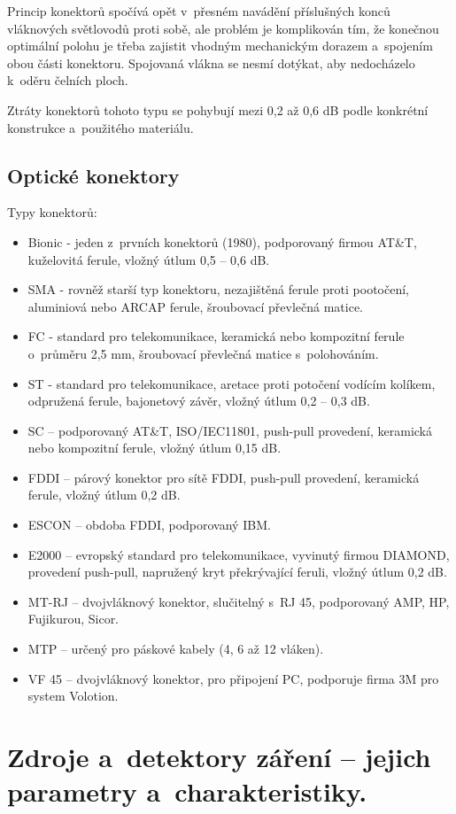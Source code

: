 Princip konektorů spočívá opět v~přesném navádění příslušných konců vláknových světlovodů proti sobě, ale problém je komplikován tím, že konečnou optimální polohu je třeba zajistit vhodným mechanickým dorazem a~spojením obou části konektoru. Spojovaná vlákna se nesmí dotýkat, aby nedocházelo k~oděru čelních ploch.

Ztráty konektorů tohoto typu se pohybují mezi 0,2 až 0,6 dB podle konkrétní konstrukce a~použitého materiálu.

\subsection{Optické konektory}
Typy konektorů:
\begin{itemize}
  \item Bionic - jeden z~prvních konektorů (1980), podporovaný firmou AT\&T, kuželovitá ferule, vložný útlum 0,5 – 0,6 dB.
  \item SMA - rovněž starší typ konektoru, nezajištěná ferule proti pootočení, aluminiová nebo ARCAP ferule, šroubovací převlečná matice.
  \item FC - standard pro telekomunikace, keramická nebo kompozitní ferule o~průměru 2,5 mm, šroubovací převlečná matice s~polohováním.
  \item ST - standard pro telekomunikace, aretace proti potočení vodícím kolíkem, odpružená ferule, bajonetový závěr, vložný útlum 0,2 – 0,3 dB.
  \item SC – podporovaný AT\&T, ISO/IEC11801, push-pull provedení, keramická nebo kompozitní ferule, vložný útlum 0,15 dB.
  \item FDDI – párový konektor pro sítě FDDI, push-pull provedení, keramická ferule, vložný útlum 0,2 dB.
  \item ESCON – obdoba FDDI, podporovaný IBM.
  \item E2000 – evropský standard pro telekomunikace, vyvinutý firmou DIAMOND, provedení push-pull, napružený kryt překrývající feruli, vložný útlum 0,2 dB.
  \item MT-RJ – dvojvláknový konektor, slučitelný s~RJ 45, podporovaný AMP, HP, Fujikurou, Sicor.
  \item MTP – určený pro páskové kabely (4, 6 až 12 vláken).
  \item VF 45 – dvojvláknový konektor, pro připojení PC, podporuje firma 3M pro system Volotion.
\end{itemize}

\clearpage
\section{Zdroje a~detektory záření – jejich parametry a~charakteristiky.}
